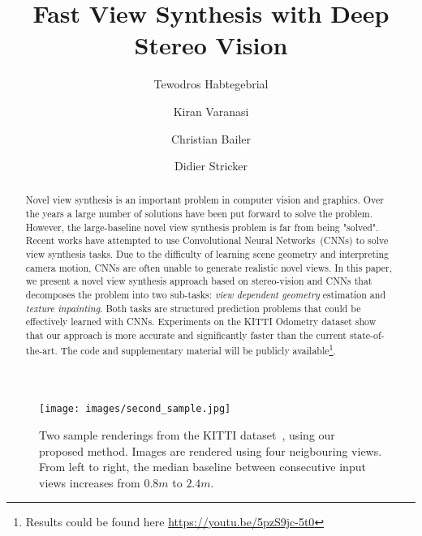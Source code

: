 \documentclass[runningheads]{llncs}
\newcommand{\squeezeup}{\vspace{-5.5mm}}
\begin{document}
\def\ECCV18SubNumber{xxxx}  %

\title{Fast View Synthesis with Deep Stereo Vision} %



\author{
Tewodros Habtegebrial  \and 
Kiran Varanasi  \and 
Christian Bailer  \and 
Didier Stricker 
}



\maketitle

\begin{abstract}

Novel view synthesis is an important problem in computer vision and graphics. Over the years a large number of solutions have been put forward to solve the problem. However, the large-baseline novel view synthesis problem is far from being "solved". Recent works have attempted to use Convolutional Neural Networks~(CNNs) to solve view synthesis tasks. Due to the difficulty of learning scene geometry and interpreting camera motion, CNNs are often unable to generate realistic novel views. In this paper, we present a novel view synthesis approach based on stereo-vision and CNNs that decomposes the problem into two sub-tasks: \textit{view dependent geometry} estimation and \textit{texture inpainting}. Both tasks are structured prediction problems that could be effectively learned with CNNs. Experiments on the KITTI Odometry dataset show that our approach is more accurate and significantly faster than the current state-of-the-art. The code and supplementary material will be publicly available\footnote{Results could be found here \url{https://youtu.be/5pzS9jc-5t0}}.

\end{abstract}

\begin{figure}[htb!]
\centering
\texttt{[image: images/second\_sample.jpg]}
\caption{Two sample renderings from the KITTI dataset~\cite{geiger2012we}, using our proposed method. Images are rendered using four neigbouring views. From left to right, the median baseline between consecutive input views increases from $0.8m$ to $2.4m$.}
\label{fig:qualitative}
\end{figure}
\squeezeup
\end{document}

